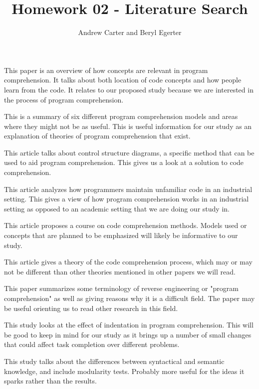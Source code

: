 \documentclass{article}
\title{Homework 02 - Literature Search}
\author{Andrew Carter and Beryl Egerter}
\begin{document}
\maketitle

This paper is an overview of how concepts are relevant in program comprehension. It talks about both location of code concepts and how people learn from the code. It relates to our proposed study because we are interested in the process of program comprehension. \cite{1021348}

This is a summary of six different program comprehension models and areas where they might not be as useful. This is useful information for our study as an explanation of theories of program comprehension that exist. \cite{402076}

This article talks about control structure diagrams, a specific method that can be used to aid program comprehension. This gives us a look at a solution to code comprehension. \cite{1000450}

This article analyzes how programmers maintain unfamiliar code in an industrial setting. This gives a view of how program comprehension works in an industrial setting as opposed to an academic setting that we are doing our study in. \cite{469502}

This article proposes a course on code comprehension methods. Models used or concepts that are planned to be emphasized will likely be informative to our study. \cite{1562886}

This article gives a theory of the code comprehension process, which may or may not be different than other theories mentioned in other papers we will read. \cite{Brooks1983543}

This paper summarizes some terminology of reverse engineering or "program comprehension" as well as giving reasons why it is a difficult field. The paper may be useful orienting us to read other research in this field. \cite{DBLP:journals/corr/abs-cs-0503068}

This study looks at the effect of indentation in program comprehension. This will be good to keep in mind for our study as it brings up a number of small changes that could affect task completion over different problems. \cite{Miara:1983:PIC:182.358437}

This study talks about the differences between syntactical and semantic knowledge, and include modularity tests. Probably more useful for the ideas it sparks rather than the results. \cite{schneiderman1979}
\end{document}
